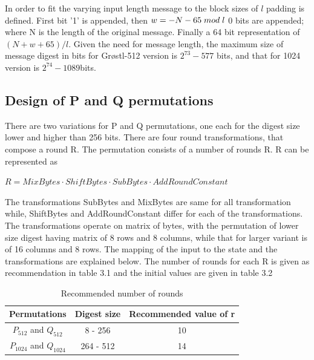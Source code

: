   In order to fit the varying input length message to the block sizes of $ l $ padding is defined. First bit '1' is
  appended, then $ w = -N - 65 \thickspace mod \thickspace l $ 0 bits are appended; where N is the length of the
  original message. Finally a 64 bit representation of $(N + w + 65) / l $. Given the need for message length, the
  maximum size of message digest in bits for Gr{\o}stl-512 version is $2^{73}-577$ bits, and that for 1024 version
  is $2^{74}-1089$bits.

  \subsection{Design of P and Q permutations}

  There are two variations for P and Q permutations, one each for the digest size lower and higher than 256 bits. There
  are four round transformations, that compose a round R. The permutation consists of a number of rounds R. R can be
  represented as 
  \begin{center}$ R = MixBytes \cdot ShiftBytes \cdot SubBytes \cdot AddRoundConstant $ \end{center}
  The transformations SubBytes and MixBytes are same for all transformation while, ShiftBytes and AddRoundConstant differ
  for each of the transformations. The transformations operate on matrix of bytes, with the permutation of lower size
  digest having matrix of 8 rows and 8 columns, while that for larger variant is of 16 columns and 8 rows. The mapping of
  the input to the state and the transformations are explained below. The number of rounds for each R is given as 
  recommendation in table 3.1 and the initial values are given in table 3.2
  
  \begin{table}
    \begin{center}
      \begin{tabular}{ *{3}{c} } \hline
        Permutations            & Digest size & Recommended value of r \\ \hline
        $P_{512}$ and $Q_{512}$   & 8 - 256     & 10 \\
        $P_{1024}$ and $Q_{1024}$ & 264 - 512   & 14 \\ \hline 
      \end{tabular}
      \caption{Recommended number of rounds\cite{00019}}
    \end{center}
  \end{table}

